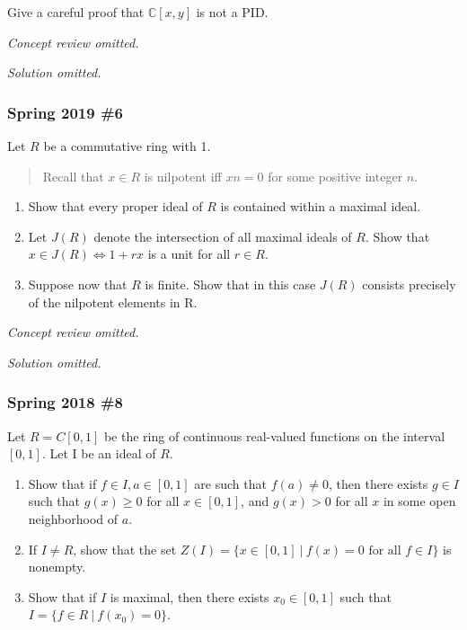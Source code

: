 Give a careful proof that \({\mathbb{C}}[x, y]\) is not a PID.

\emph{Concept review omitted.}

\emph{Solution omitted.}

\hypertarget{spring-2019-6}{%
\subsubsection{Spring 2019 \#6}\label{spring-2019-6}}

Let \(R\) be a commutative ring with 1.

\begin{quote}
Recall that \(x \in R\) is nilpotent iff \(xn = 0\) for some positive
integer \(n\).
\end{quote}

\begin{enumerate}
\def\labelenumi{\alph{enumi}.}
\item
  Show that every proper ideal of \(R\) is contained within a maximal
  ideal.
\item
  Let \(J(R)\) denote the intersection of all maximal ideals of \(R\).
  Show that \(x \in J(R) \iff 1 + rx\) is a unit for all \(r \in R\).
\item
  Suppose now that \(R\) is finite. Show that in this case \(J(R)\)
  consists precisely of the nilpotent elements in R.
\end{enumerate}

\emph{Concept review omitted.}

\emph{Solution omitted.}

\hypertarget{spring-2018-8}{%
\subsubsection{Spring 2018 \#8}\label{spring-2018-8}}

Let \(R = C[0, 1]\) be the ring of continuous real-valued functions on
the interval \([0, 1]\). Let I be an ideal of \(R\).

\begin{enumerate}
\def\labelenumi{\alph{enumi}.}
\item
  Show that if \(f \in I, a \in [0, 1]\) are such that \(f (a) \neq 0\),
  then there exists \(g \in I\) such that \(g(x) \geq 0\) for all
  \(x \in [0, 1]\), and \(g(x) > 0\) for all \(x\) in some open
  neighborhood of \(a\).
\item
  If \(I \neq R\), show that the set
  \(Z(I) = \{x \in [0, 1] {~\mathrel{\Big\vert}~}f(x) = 0 \text{ for all } f \in I\}\)
  is nonempty.
\item
  Show that if \(I\) is maximal, then there exists \(x_0 \in [0, 1]\)
  such that \(I = \{ f \in R {~\mathrel{\Big\vert}~}f (x_0 ) = 0\}\).
\end{enumerate}

